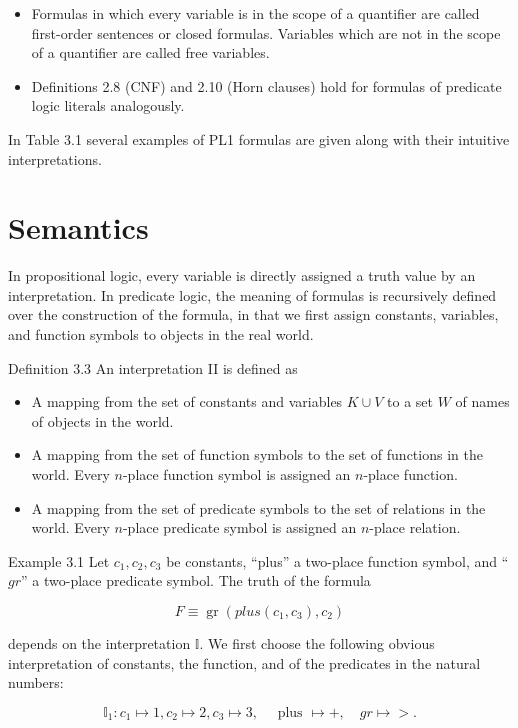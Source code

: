 \documentclass[10pt]{book}
\begin{document}
\begin{itemize}
  \item Formulas in which every variable is in the scope of a quantifier are called first-order sentences or closed formulas. Variables which are not in the scope of a quantifier are called free variables.
  \item Definitions 2.8 (CNF) and 2.10 (Horn clauses) hold for formulas of predicate logic literals analogously.
\end{itemize}
In Table 3.1 several examples of PL1 formulas are given along with their intuitive interpretations.

\section{Semantics}
In propositional logic, every variable is directly assigned a truth value by an interpretation. In predicate logic, the meaning of formulas is recursively defined over the construction of the formula, in that we first assign constants, variables, and function symbols to objects in the real world.

Definition 3.3 An interpretation II is defined as

\begin{itemize}
  \item A mapping from the set of constants and variables $K \cup V$ to a set $W$ of names of objects in the world.
  \item A mapping from the set of function symbols to the set of functions in the world. Every $n$-place function symbol is assigned an $n$-place function.
  \item A mapping from the set of predicate symbols to the set of relations in the world. Every $n$-place predicate symbol is assigned an $n$-place relation.
\end{itemize}

Example 3.1 Let $c_{1}, c_{2}, c_{3}$ be constants, ``plus'' a two-place function symbol, and ``$g r$'' a two-place predicate symbol. The truth of the formula

$$
F \equiv \operatorname{gr}\left(p l u s\left(c_{1}, c_{3}\right), c_{2}\right)
$$

depends on the interpretation $\mathbb{I}$. We first choose the following obvious interpretation of constants, the function, and of the predicates in the natural numbers:

$$
\mathbb{I}_{1}: c_{1} \mapsto 1, c_{2} \mapsto 2, c_{3} \mapsto 3, \quad \text { plus } \mapsto+, \quad g r \mapsto>.
$$
\end{document}
